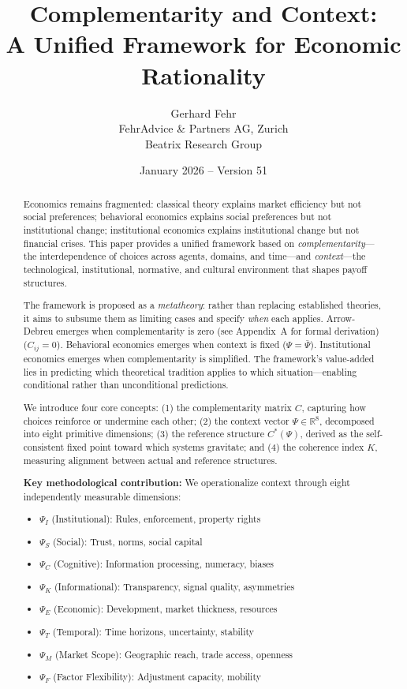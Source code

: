 \documentclass[12pt,a4paper]{article}
\title{Complementarity and Context:\\
A Unified Framework for Economic Rationality}
\author{Gerhard Fehr\\
FehrAdvice \& Partners AG, Zurich\\
Beatrix Research Group}
\date{January 2026 -- Version 51}
\begin{document}
\maketitle

\begin{abstract}
Economics remains fragmented: classical theory explains market efficiency but not social preferences; behavioral economics explains social preferences but not institutional change; institutional economics explains institutional change but not financial crises. This paper provides a unified framework based on \emph{complementarity}---the interdependence of choices across agents, domains, and time---and \emph{context}---the technological, institutional, normative, and cultural environment that shapes payoff structures.

The framework is proposed as a \emph{metatheory}: rather than replacing established theories, it aims to subsume them as limiting cases and specify \emph{when} each applies. Arrow-Debreu emerges when complementarity is zero (see Appendix~A for formal derivation) ($C_{ij} = 0$). Behavioral economics emerges when context is fixed ($\Psi = \bar{\Psi}$). Institutional economics emerges when complementarity is simplified. The framework's value-added lies in predicting which theoretical tradition applies to which situation---enabling conditional rather than unconditional predictions.

We introduce four core concepts: (1) the complementarity matrix $C$, capturing how choices reinforce or undermine each other; (2) the context vector $\Psi \in \mathbb{R}^8$, decomposed into eight primitive dimensions; (3) the reference structure $C^*(\Psi)$, derived as the self-consistent fixed point toward which systems gravitate; and (4) the coherence index $K$, measuring alignment between actual and reference structures.

\textbf{Key methodological contribution:} We operationalize context through eight independently measurable dimensions:
\begin{itemize}
    \item $\Psi_I$ (Institutional): Rules, enforcement, property rights
    \item $\Psi_S$ (Social): Trust, norms, social capital
    \item $\Psi_C$ (Cognitive): Information processing, numeracy, biases
    \item $\Psi_K$ (Informational): Transparency, signal quality, asymmetries
    \item $\Psi_E$ (Economic): Development, market thickness, resources
    \item $\Psi_T$ (Temporal): Time horizons, uncertainty, stability
    \item $\Psi_M$ (Market Scope): Geographic reach, trade access, openness
    \item $\Psi_F$ (Factor Flexibility): Adjustment capacity, mobility
\end{itemize}


\end{abstract}
\end{document}

